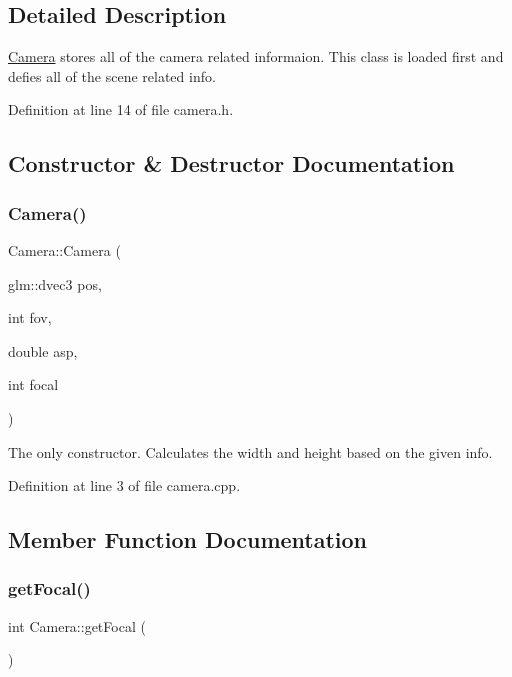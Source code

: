\subsection{Detailed Description}
\mbox{\hyperlink{class_camera}{Camera}} stores all of the camera related informaion. This class is loaded first and defies all of the scene related info. 

Definition at line 14 of file camera.\+h.



\subsection{Constructor \& Destructor Documentation}
\mbox{\label{class_camera_a9b4b8e1957b7e177a5d1a049c11f053f}} 
\subsubsection{\texorpdfstring{Camera()}{Camera()}}
{\footnotesize\ttfamily Camera\+::\+Camera (\begin{DoxyParamCaption}\item[{glm\+::dvec3}]{pos,  }\item[{int}]{fov,  }\item[{double}]{asp,  }\item[{int}]{focal }\end{DoxyParamCaption})}



The only constructor. Calculates the width and height based on the given info. 



Definition at line 3 of file camera.\+cpp.



\subsection{Member Function Documentation}
\mbox{\label{class_camera_a5045b4557d3cd7cd4c64c49f5a693aa5}} 
\subsubsection{\texorpdfstring{get\+Focal()}{getFocal()}}
{\footnotesize\ttfamily int Camera\+::get\+Focal (\begin{DoxyParamCaption}{ }\end{DoxyParamCaption})\hspace{0.3cm}{\ttfamily [inline]}}



